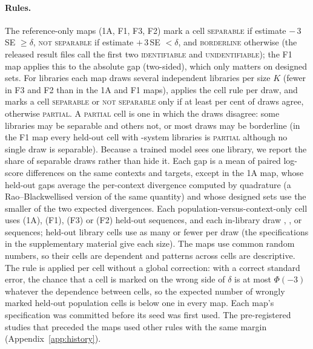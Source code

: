 \paragraph{Rules.} The reference-only maps (1A, F1, F3, F2) mark a cell \textsc{separable} if estimate $-\,3\,$SE $\ge\delta$, \textsc{not separable} if
estimate $+\,3\,$SE $<\delta$, and \textsc{borderline} otherwise (the released result files call the first two
\textsc{identifiable} and \textsc{unidentifiable}); the F1 map applies this to the absolute gap (two-sided), which only matters
on designed sets. For libraries each map draws several independent libraries per size $K$ (fewer in F3 and F2 than in the 1A
and F1 maps), applies the cell rule per draw, and marks a cell \textsc{separable} or \textsc{not separable} only if at least
\DrawPct per cent of draws agree, otherwise \textsc{partial}. A \textsc{partial} cell is one in which the draws disagree:
some libraries may be separable and others not, or most draws may be borderline (in the F1 map every held-out cell with
\KThirtyTwo-system libraries is \textsc{partial} although no single draw is separable). Because a trained model sees one
library, we report the share of separable draws rather than hide it. Each gap is a mean of paired log-score differences on
the same contexts and targets, except in the 1A map, whose held-out gaps average the per-context divergence computed by
quadrature (a Rao--Blackwellised version of the same quantity) and whose designed sets use the smaller of the two expected
divergences. Each population-versus-context-only cell uses \SizeOneAHeld (1A), \SizeFoneHeld (F1), \SizeFthreeHeld (F3) or
\SizeFtwoHeld (F2) held-out sequences, and each in-library draw \SizeOneALib, \SizeFoneLib, \SizeFthreeLib or \SizeFtwoLib
sequences; held-out library cells use as many or fewer per draw (the specifications in the supplementary material give each
size). The maps use common random numbers, so their cells are dependent and
patterns across cells are descriptive. The rule is applied per cell without a global correction: with a correct standard error, the chance that a cell
is marked on the wrong side of $\delta$ is at most $\Phi(-3)$ whatever the dependence between cells, so the expected number of
wrongly marked held-out population cells is below one in every map. Each map's specification was committed before its seed
was first used. The pre-registered studies that preceded the maps used other rules with the same margin
(Appendix~\ref{app:history}).

